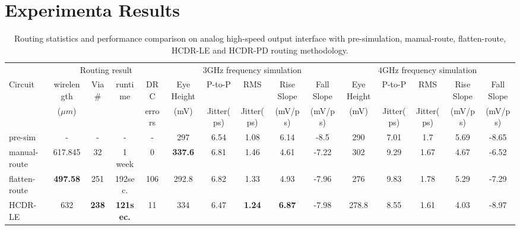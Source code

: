   \section{Experimenta Results}\label{sec:CUCLMExp}

    \begin{table}

      \caption{Routing statistics and performance comparison on analog high-speed output interface with pre-simulation, manual-route, flatten-route, HCDR-LE and HCDR-PD routing methodology.}
      \label{table:HCDRResult}
      \begin{lrbox}{\tablebox}
      \begin{threeparttable}
      \begin{small}
      \begin{tabular}{|l|c|c|c|c|c|c|c|c|c|c|c|c|c|c|}
            \hline
                    & \multicolumn{4}{c|}{Routing result} & \multicolumn{5}{c|}{3GHz frequency simulation} 
                       & \multicolumn{5}{c|}{4GHz frequency simulation}\\ \cline{2-15}
            Circuit     & wirelength  & Via\#   & runtime & DRC     & Eye Height  &P-to-P     & RMS     &Rise Slope 
            & Fall Slope  & Eye Height  &P-to-P   & RMS   &Rise Slope & Fall Slope\\
                    & (${\mu}m$)  &     &     & errors  & (mV)    & Jitter(ps)  & Jitter(ps)&(mV/ps)          
            & (mV/ps)   & (mV)    &Jitter(ps) & Jitter(ps)&(mV/ps)  & (mV/ps) \\  
            \rowcolor{black}
            \hline
            \rowcolor{mygray}
            pre-sim         & -     & -   & -     & -   & 297     & 6.54    & 1.08    & 6.14    
            & -8.5    & 290     & 7.01  & 1.7   & 5.69  & -8.65 \\    
            \hline
            manual-route\tnote{a} & 617.845   &   32    & 1 week    & 0   &{\bf 337.6}  & 6.81    & 1.46    & 4.61    
            & -7.22   & 302     & 9.29  & 1.67    & 4.67  & -6.52 \\
            \hline
            flatten-route\tnote{b}  & {\bf 497.58}& 251   & 192sec.   & 106   & 292.8   & 6.82    & 1.33    & 4.93    
            & -7.96   & 276     & 9.83  & 1.78    & 5.29  & -7.29 \\
            \hline
            HCDR-LE\tnote{c}    &   632     &{\bf 238}  &{\bf121sec.} & 11    &   334     & 6.47    &{\bf 1.24} &{\bf 6.87} 
            & -7.98   & 278.8   & 8.55  & 1.61    & 4.03  & -8.97 \\

\end{tabular}
\end{small}
\end{threeparttable}
\end{lrbox}
\end{table}
